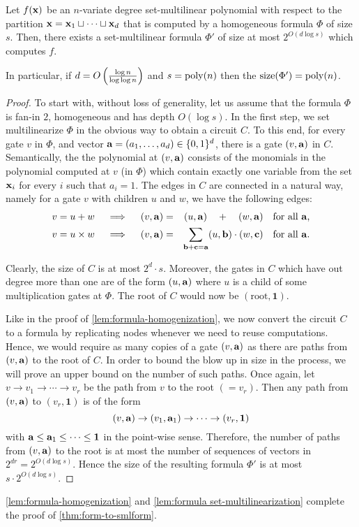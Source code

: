 \begin{lemma}\label{lem:formula set-multilinearization}
  Let $f(\mathbf{x})$ be an $n$-variate degree set-multilinear polynomial with respect to the partition $\mathbf{x} = \mathbf{x}_1\sqcup \cdots \sqcup \mathbf{x}_d$ that is computed by a homogeneous formula $\Phi$ of size $s$.
Then, there exists a set-multilinear formula $\Phi'$ of size at most $2^{O(d\log s)}$ which computes $f$.

In particular, if $d = O\left(\frac{\log n}{\log \log n}\right)$ and $s = \operatorname{poly}(n)$ then the $\mathrm{size}(\Phi') = \operatorname{poly}(n)$.  
\end{lemma}
\begin{proof}
To start with, without loss of generality, let us assume that the formula $\Phi$ is fan-in $2$, homogeneous and has depth $O(\log s)$.
In the first step, we set multilinearize $\Phi$ in the obvious way to obtain a circuit $C$.
To this end, for every gate $v$ in $\Phi$, and vector $\mathbf{a} = (a_1,\ldots, a_d) \in \{0,1\}^d$, there is a gate $(v, \mathbf{a})$ in $C$.
Semantically, the the polynomial at $(v,\mathbf{a})$ consists of the monomials in the polynomial computed at $v$ (in $\Phi$) which contain exactly one variable from the set $\mathbf{x}_i$ for every $i$ such that $a_i = 1$.
The edges in $C$ are connected in a natural way, namely for a gate $v$ with children $u$ and $w$, we have the following edges:
\begin{eqnarray*}
\text{$v = u + w$}\quad\implies\quad (v, \mathbf{a}) &=& (u, \mathbf{a}) \quad + \quad (w, \mathbf{a})\quad\text{for all $\mathbf{a}$,}\\
\text{$v = u \times w$}\quad\implies\quad (v, \mathbf{a}) &=& \sum_{\mathbf{b} + \mathbf{c} = \mathbf{a}} (u, \mathbf{b})\cdot (w, \mathbf{c}) \quad\text{for all $\mathbf{a}$}.
\end{eqnarray*}
 
Clearly, the size of $C$ is at most $2^d\cdot s$.
Moreover, the gates in $C$ which have out degree more than one are of the form $(u,\mathbf{a})$ where $u$ is a child of some multiplication gates at $\Phi$. 
The root of $C$ would now be $(\text{root},\mathbf{1})$. 

Like in the proof of \autoref{lem:formula-homogenization}, we now convert the circuit $C$ to a formula by replicating nodes whenever we need to reuse computations.
Hence, we would require as many copies of a gate $(v, \mathbf{a})$ as there are paths from $(v,\mathbf{a})$ to the root of $C$.
In order to bound the blow up in size in the process, we will prove an upper bound on the number of such paths.
Once again, let $v \rightarrow v_1 \rightarrow \cdots \rightarrow v_r$ be the path from $v$ to the root $(=v_r)$.
Then any path from $(v,\mathbf{a})$ to $(v_r,\mathbf{1})$ is of the form
\[
(v,\mathbf{a}) \rightarrow (v_1,\mathbf{a}_1) \rightarrow \cdots \rightarrow (v_r,\mathbf{1})
\]
with $\mathbf{a} \leq \mathbf{a}_1 \leq \cdots \leq \mathbf{1}$ in the point-wise sense.
Therefore, the number of paths from $(v,\mathbf{a})$ to the root is at most the number of sequences of vectors in $2^{dr} = 2^{O(d\log s)}$.
Hence the size of the resulting formula $\Phi'$ is at most $s \cdot 2^{O(d \log s)}$. 
\end{proof}

\autoref{lem:formula-homogenization} and \autoref{lem:formula set-multilinearization} complete the proof of \autoref{thm:form-to-smlform}. 




